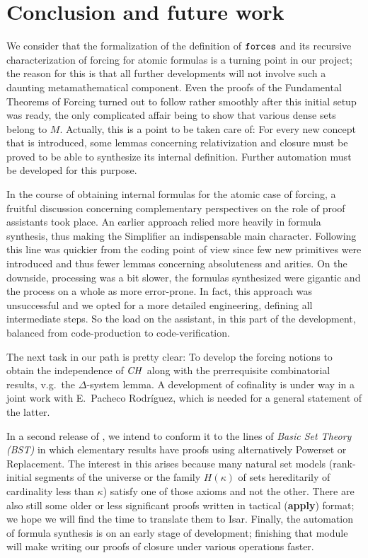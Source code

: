 \section{Conclusion and future work}
\label{sec:conclusion}

We consider that the formalization of the definition of $\mathop{\mathtt{forces}}$
and its recursive characterization of forcing for atomic formulas is
a turning point
in our project; the reason for this is that all further
developments will not involve such a daunting metamathematical
component. Even the proofs of the Fundamental Theorems of Forcing
turned out to follow rather smoothly after this initial setup was
ready, the only complicated affair being to show that various dense sets belong
to $M$. 
%
Actually, this is a point to be taken care of: For every new
concept that is introduced, some lemmas concerning 
relativization and closure must be proved to be able to synthesize its
internal definition. Further automation must be developed for this
purpose.

In the course of obtaining internal formulas for the atomic case of
forcing, a fruitful discussion
concerning complementary perspectives on the role of proof assistants
took place. An earlier approach relied more heavily in formula
synthesis, thus making the Simplifier an indispensable main
character. Following this line was quickier from the coding point of
view since few new primitives were introduced and thus fewer lemmas
concerning absoluteness and arities. On the downside, processing was a
bit slower, the formulas synthesized were gigantic and the process on
a whole as more error-prone. In fact, this approach was unsuccessful
and we opted for a more detailed engineering, defining all
intermediate steps. So the load on the assistant, in this part of the
development, balanced from code-production to code-verification. 

The next task in our path is pretty clear: To develop the forcing
notions to obtain the independence of $\mathit{CH}$ 
along with the prerrequisite combinatorial results, v.g.\ the
$\Delta$-system lemma. A development of cofinality is under way in a
joint work with E.~Pacheco Rodríguez, which is needed for a general
statement of the latter. 

In a second release of , we intend to conform
it to the lines of \emph{Basic Set Theory (BST)}
\cite[I.3.1]{kunen2011set} in which elementary results have proofs
using alternatively Powerset or Replacement. The interest in this
arises because many natural set models (rank-initial segments of the
universe or the family $H(\kappa)$ of sets hereditarily of cardinality
less than $\kappa$) satisfy one of those axioms and not the
other. There are also still some older or less significant proofs
written in tactical (\textbf{apply}) format; we hope we will find the
time to translate them to Isar. Finally, the automation of formula
synthesis is on an early stage of development; finishing that module
will make writing our proofs of closure under various operations
faster.

